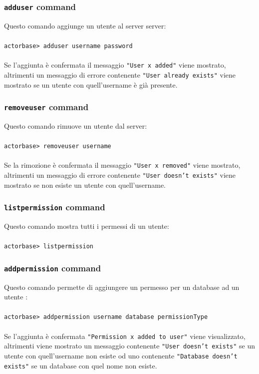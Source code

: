 \documentclass[a4paper]{article}
\begin{document}
	\subsubsection{\texttt{adduser} command}
	Questo comando aggiunge un utente al server server:
	\\ \\
	\texttt{actorbase>	adduser username password}
	\\ \\
	Se l'aggiunta è confermata il messaggio \texttt{"User x added"} viene mostrato, altrimenti un messaggio di errore contenente \texttt{"User already exists"} viene mostrato se un utente con quell'username è già presente.

	\subsubsection{\texttt{removeuser} command}
	Questo comando rimuove un utente dal server:
	\\ \\
	\texttt{actorbase>	removeuser username}
	\\ \\
	Se la rimozione è confermata il messaggio \texttt{"User x removed"} viene mostrato, altrimenti un messaggio di errore contenente \texttt{"User doesn't exists"} viene mostrato se non esiste un utente con quell'username.
	
	\subsubsection{\texttt{listpermission} command}
	Questo comando mostra tutti i permessi di un utente:
	\\ \\
	\texttt{actorbase> listpermission}

	\subsubsection{\texttt{addpermission} command}
	Questo comando permette di aggiungere un permesso per un database ad un utente :
	\\ \\
	\texttt{actorbase>	addpermission username database permissionType}
	\\ \\	
	Se l'aggiunta è confermata \texttt{"Permission x added to user"} viene visualizzato, altrimenti viene mostrato un messaggio contenente \texttt{"User doesn't exists"} se un utente con quell'username non esiste od uno contenente \texttt{"Database doesn't exists"} se un database con quel nome non esiste.
\end{document}
